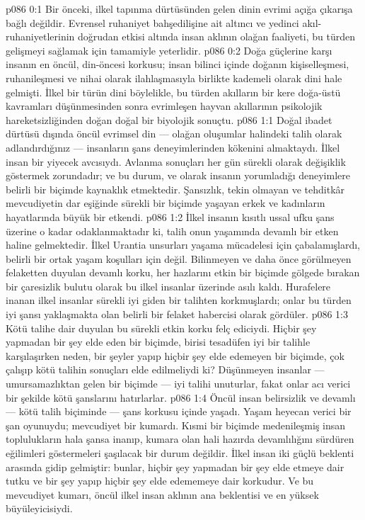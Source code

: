 \vs p086 0:1 Bir önceki, ilkel tapınma dürtüsünden gelen dinin evrimi açığa çıkarışa bağlı değildir. Evrensel ruhaniyet bahşedilişine ait altıncı ve yedinci akıl\hyp{}ruhaniyetlerinin doğrudan etkisi altında insan aklının olağan faaliyeti, bu türden gelişmeyi sağlamak için tamamiyle yeterlidir.
\vs p086 0:2 Doğa güçlerine karşı insanın en öncül, din\hyp{}öncesi korkusu; insan bilinci içinde doğanın kişiselleşmesi, ruhanileşmesi ve nihai olarak ilahlaşmasıyla birlikte kademeli olarak dini hale gelmişti. İlkel bir türün dini böylelikle, bu türden akılların bir kere doğa\hyp{}üstü kavramları düşünmesinden sonra evrimleşen hayvan akıllarının psikolojik hareketsizliğinden doğan doğal bir biyolojik sonuçtu.
\vs p086 1:1 Doğal ibadet dürtüsü dışında öncül evrimsel din --- olağan oluşumlar halindeki talih olarak adlandırdığınız --- insanların şans deneyimlerinden kökenini almaktaydı. İlkel insan bir yiyecek avcısıydı. Avlanma sonuçları her gün sürekli olarak değişiklik göstermek zorundadır; ve bu durum,  ve  olarak insanın yorumladığı deneyimlere belirli bir biçimde kaynaklık etmektedir. Şansızlık, tekin olmayan ve tehditkâr mevcudiyetin dar eşiğinde sürekli bir biçimde yaşayan erkek ve kadınların hayatlarında büyük bir etkendi.
\vs p086 1:2 İlkel insanın kısıtlı ussal ufku şans üzerine o kadar odaklanmaktadır ki, talih onun yaşamında devamlı bir etken haline gelmektedir. İlkel Urantia unsurları yaşama mücadelesi için çabalamışlardı, belirli bir ortak yaşam koşulları için değil. Bilinmeyen ve daha önce görülmeyen felaketten duyulan devamlı korku, her hazlarını etkin bir biçimde gölgede bırakan bir çaresizlik bulutu olarak bu ilkel insanlar üzerinde asılı kaldı. Hurafelere inanan ilkel insanlar sürekli iyi giden bir talihten korkmuşlardı; onlar bu türden iyi şansı yaklaşmakta olan belirli bir felaket habercisi olarak gördüler.
\vs p086 1:3 Kötü talihe dair duyulan bu sürekli etkin korku felç ediciydi. Hiçbir şey yapmadan bir şey elde eden bir biçimde, birisi tesadüfen iyi bir talihle karşılaşırken neden, bir şeyler yapıp hiçbir şey elde edemeyen bir biçimde, çok çalışıp kötü talihin sonuçları elde edilmeliydi ki? Düşünmeyen insanlar --- umursamazlıktan gelen bir biçimde --- iyi talihi unuturlar, fakat onlar acı verici bir şekilde kötü şanslarını hatırlarlar.
\vs p086 1:4 Öncül insan belirsizlik ve devamlı --- kötü talih biçiminde --- şans korkusu içinde yaşadı. Yaşam heyecan verici bir şan oyunuydu; mevcudiyet bir kumardı. Kısmi bir biçimde medenileşmiş insan toplulukların hala şansa inanıp, kumara olan hali hazırda devamlılığını sürdüren eğilimleri göstermeleri şaşılacak bir durum değildir. İlkel insan iki güçlü beklenti arasında gidip gelmiştir: bunlar, hiçbir şey yapmadan bir şey elde etmeye dair tutku ve bir şey yapıp hiçbir şey elde edememeye dair korkudur. Ve bu mevcudiyet kumarı, öncül ilkel insan aklının ana beklentisi ve en yüksek büyüleyicisiydi.
